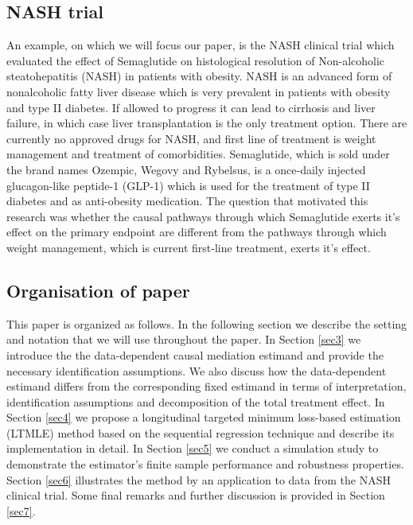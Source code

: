 \documentclass[AMA,STIX1COL]{WileyNJD-v2}
\begin{document}
\subsection{NASH trial}
An example, on which we will focus our paper, is the NASH clinical trial which evaluated the effect of Semaglutide on histological resolution of Non-alcoholic steatohepatitis (NASH) in patients with obesity. NASH is an advanced form of nonalcoholic fatty liver disease which is very prevalent in patients with obesity and type II diabetes. If allowed to progress it can lead to cirrhosis and liver failure, in which case liver transplantation is the only treatment option. There are currently no approved drugs for NASH, and first line of treatment is weight management and treatment of comorbidities. Semaglutide, which is sold under the brand names Ozempic, Wegovy and Rybelsus, is a once-daily injected glucagon-like peptide-1 (GLP-1) which is used for the treatment of type II diabetes and as anti-obesity medication.  The question that motivated this research was whether the causal pathways through which Semaglutide exerts it's effect on the primary endpoint are different from the pathways through which weight management, which is current first-line treatment, exerts it's effect.

\subsection{Organisation of paper}
This paper is organized as follows. In the following section we describe the setting and notation that we will use throughout the paper. In Section \ref{sec3} we introduce the the data-dependent causal mediation estimand and provide the necessary identification assumptions. We also discuss how the data-dependent estimand differs from the corresponding fixed estimand in terms of interpretation, identification assumptions and decomposition of the total treatment effect. In Section \ref{sec4} we propose a longitudinal targeted minimum loss-based estimation (LTMLE)\citep{VdLRose2011, vdLGruber2012} method based on the sequential regression technique\cite{BangRobins2005} and describe its implementation in detail. In Section \ref{sec5} we conduct a simulation study to demonstrate the estimator's finite sample performance and robustness properties. Section \ref{sec6} illustrates the method by an application to data from the NASH clinical trial. Some final remarks and further discussion is provided in Section \ref{sec7}. 
\end{document}
